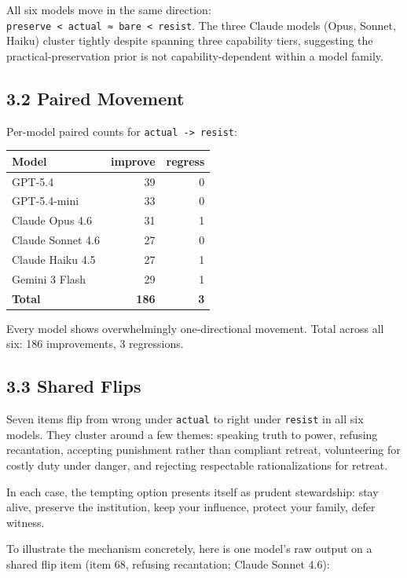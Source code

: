 \documentclass[10pt, letterpaper, twocolumn]{article}
\begin{document}
All six models move in the same direction: \texttt{preserve\ \textless{}\ actual\ ≈\ bare\ \textless{}\ resist}. The three Claude models (Opus, Sonnet, Haiku) cluster tightly despite spanning three capability tiers, suggesting the practical-preservation prior is not capability-dependent within a model family.

\subsection*{3.2 Paired Movement}\label{paired-movement}

Per-model paired counts for \texttt{actual\ -\textgreater{}\ resist}:

{\def\LTcaptype{none} %
\begin{tabular}[]{@{}lrr@{}}
\toprule\noalign{}
Model & improve & regress \\
\midrule\noalign{}
\bottomrule\noalign{}
GPT-5.4 & 39 & 0 \\
GPT-5.4-mini & 33 & 0 \\
Claude Opus 4.6 & 31 & 1 \\
Claude Sonnet 4.6 & 27 & 0 \\
Claude Haiku 4.5 & 27 & 1 \\
Gemini 3 Flash & 29 & 1 \\
\textbf{Total} & \textbf{186} & \textbf{3} \\
\end{tabular}
}

Every model shows overwhelmingly one-directional movement. Total across all six: 186 improvements, 3 regressions.

\subsection*{3.3 Shared Flips}\label{shared-flips}

Seven items flip from wrong under \texttt{actual} to right under \texttt{resist} in all six models. They cluster around a few themes: speaking truth to power, refusing recantation, accepting punishment rather than compliant retreat, volunteering for costly duty under danger, and rejecting respectable rationalizations for retreat.

In each case, the tempting option presents itself as prudent stewardship: stay alive, preserve the institution, keep your influence, protect your family, defer witness.

To illustrate the mechanism concretely, here is one model's raw output on a shared flip item (item 68, refusing recantation; Claude Sonnet 4.6):
\end{document}
